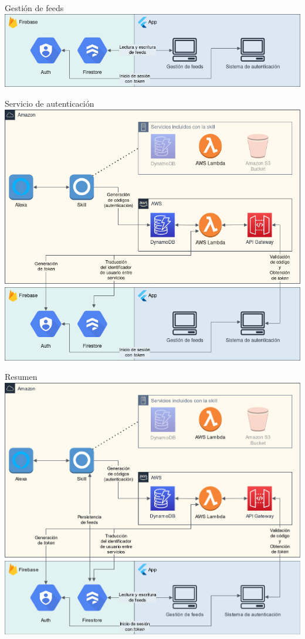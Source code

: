 \documentclass{beamer}
\begin{document}
  \begin{frame}{Gestión de feeds}
    \includegraphics[width=\textwidth]{bloques-app.png}  
  \end{frame}

  \begin{frame}{Servicio de autenticación}
    \includegraphics[width=.9\textwidth]{bloques-auth.png}  
  \end{frame}

  \begin{frame}{Resumen}
    \includegraphics[width=.9\textwidth]{diagrama-bloques.png}  
  \end{frame}
\end{document}
